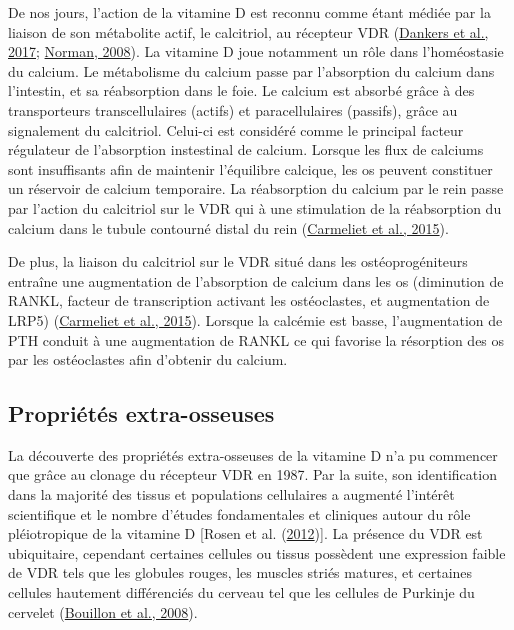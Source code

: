 \documentclass[
  a4paper,
  DIV=11,
  numbers=noendperiod,
  listof=totoc]{scrreprt}
\begin{document}
De nos jours, l'action de la vitamine D est reconnu comme étant médiée
par la liaison de son métabolite actif, le calcitriol, au récepteur VDR
(\protect\hyperlink{ref-Dankers.2017}{Dankers et al., 2017};
\protect\hyperlink{ref-Norman.2008}{Norman, 2008}). La vitamine D joue
notamment un rôle dans l'homéostasie du calcium. Le métabolisme du
calcium passe par l'absorption du calcium dans l'intestin, et sa
réabsorption dans le foie. Le calcium est absorbé grâce à des
transporteurs transcellulaires (actifs) et paracellulaires (passifs),
grâce au signalement du calcitriol. Celui-ci est considéré comme le
principal facteur régulateur de l'absorption instestinal de calcium.
Lorsque les flux de calciums sont insuffisants afin de maintenir
l'équilibre calcique, les os peuvent constituer un réservoir de calcium
temporaire. La réabsorption du calcium par le rein passe par l'action du
calcitriol sur le VDR qui à une stimulation de la réabsorption du
calcium dans le tubule contourné distal du rein
(\protect\hyperlink{ref-Carmeliet.2015}{Carmeliet et al., 2015}).

De plus, la liaison du calcitriol sur le VDR situé dans les
ostéoprogéniteurs entraîne une augmentation de l'absorption de calcium
dans les os (diminution de RANKL, facteur de transcription activant les
ostéoclastes, et augmentation de LRP5)
(\protect\hyperlink{ref-Carmeliet.2015}{Carmeliet et al., 2015}).
Lorsque la calcémie est basse, l'augmentation de PTH conduit à une
augmentation de RANKL ce qui favorise la résorption des os par les
ostéoclastes afin d'obtenir du calcium.

\hypertarget{propriuxe9tuxe9s-extra-osseuses}{%
\subsection{Propriétés
extra-osseuses}\label{propriuxe9tuxe9s-extra-osseuses}}

La découverte des propriétés extra-osseuses de la vitamine D n'a pu
commencer que grâce au clonage du récepteur VDR en 1987. Par la suite,
son identification dans la majorité des tissus et populations
cellulaires a augmenté l'intérêt scientifique et le nombre d'études
fondamentales et cliniques autour du rôle pléiotropique de la vitamine D
{[}Rosen et al. (\protect\hyperlink{ref-Rosen.2012}{2012}){]}. La
présence du VDR est ubiquitaire, cependant certaines cellules ou tissus
possèdent une expression faible de VDR tels que les globules rouges, les
muscles striés matures, et certaines cellules hautement différenciés du
cerveau tel que les cellules de Purkinje du cervelet
(\protect\hyperlink{ref-Bouillon.2008}{Bouillon et al., 2008}).
\end{document}
